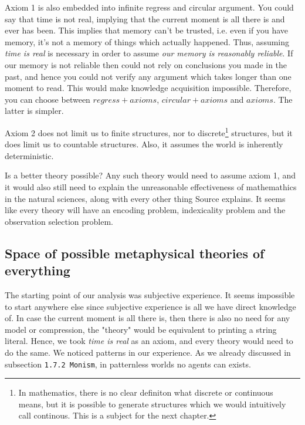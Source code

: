 Axiom 1 is also embedded into infinite regress and circular argument.
You could say that time is not real, implying that the current moment is all there is and ever has been.
This implies that memory can't be trusted, i.e. even if you have memory, it's not a memory of things which actually happened.
Thus, assuming \textit{time is real} is necessary in order to assume \textit{our memory is reasonably reliable}.
If our memory is not reliable then could not rely on conclusions you made in the past, and hence you could not verify any argument which takes longer than one moment to read.
This would make knowledge acquisition impossible.
Therefore, you can choose between $regress + axioms$, $circular + axioms$ and $axioms$.
The latter is simpler.

Axiom 2 does not limit us to finite structures, nor to discrete\footnote{In mathematics, there is no clear definiton what discrete or continuous means, but it is possible to generate structures which we would intuitively call continous. This is a subject for the next chapter.} structures, but it does limit us to countable structures. Also, it assumes the world is inherently deterministic.

Is a better theory possible?
Any such theory would need to assume axiom 1, and it would also still need to explain the unreasonable effectiveness of mathemathics in the natural sciences, along with every other thing Source explains.
It seems like every theory will have an encoding problem, indexicality problem and the observation selection problem.


\newpage

\subsection{Space of possible metaphysical theories of everything}

The starting point of our analysis was subjective experience.
It seems impossible to start anywhere else since subjective experience is all we have direct knowledge of.
In case the current moment is all there is, then there is also no need for any model or compression, the "theory" would be equivalent to printing a string literal.
Hence, we took \textit{time is real} as an axiom, and every theory would need to do the same. We noticed patterns in our experience. As we already discussed in subsection \texttt{1.7.2 Monism}, in patternless worlds no agents can exists.

